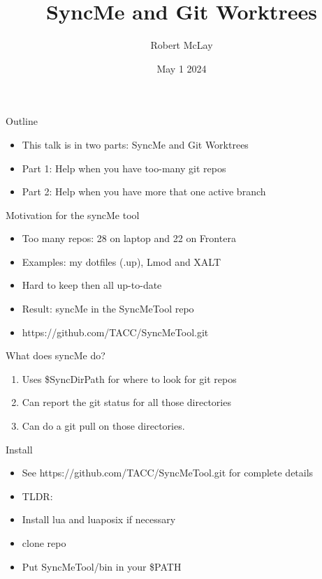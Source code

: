 \documentclass{beamer}
\begin{document}
\title[SyncMe]{SyncMe and Git Worktrees}
\author{Robert McLay} 
\date{May 1 2024}

\frame{\titlepage} 


\begin{frame}{Outline}
  \begin{itemize}
    \item This talk is in two parts: SyncMe and Git Worktrees
    \item Part 1: Help when you have too-many git repos
    \item Part 2: Help when you have more that one active branch
  \end{itemize}
\end{frame}

\begin{frame}{Motivation for the syncMe tool }
  \begin{itemize}
    \item Too many repos: 28 on laptop and 22 on Frontera
    \item Examples: my dotfiles (.up), Lmod and XALT
    \item Hard to keep then all up-to-date
    \item Result: syncMe in the SyncMeTool repo
    \item https://github.com/TACC/SyncMeTool.git
  \end{itemize}
\end{frame}

\begin{frame}{What does syncMe do?}
  \begin{enumerate}
    \item Uses \$SyncDirPath for where to look for git repos
    \item Can report the git status for all those directories
    \item Can do a git pull on those directories.
  \end{enumerate}
\end{frame}

\begin{frame}{Install}
  \begin{itemize}
    \item See https://github.com/TACC/SyncMeTool.git for complete details
    \item TLDR:
    \item Install lua and luaposix if necessary
    \item clone repo
    \item Put SyncMeTool/bin in your \$PATH
  \end{itemize}
\end{frame}
\end{document}
